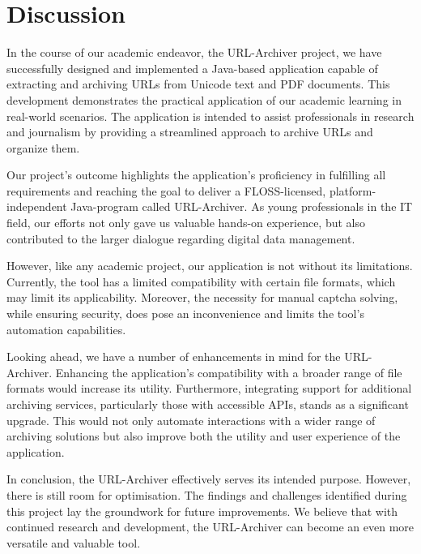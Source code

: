 \section{Discussion}
In the course of our academic endeavor, the URL-Archiver project, we have successfully designed and implemented a Java-based application capable of extracting and archiving URLs from Unicode text and PDF documents.
This development demonstrates the practical application of our academic learning in real-world scenarios.
The application is intended to assist professionals in research and journalism by providing a streamlined approach to archive URLs and organize them.

Our project's outcome highlights the application’s proficiency in fulfilling all requirements and reaching the goal to deliver a FLOSS-licensed, platform-independent Java-program called URL-Archiver.
As young professionals in the IT field, our efforts not only gave us valuable hands-on experience, but also contributed to the larger dialogue regarding digital data management.

However, like any academic project, our application is not without its limitations.
Currently, the tool has a limited compatibility with certain file formats, which may limit its applicability.
Moreover, the necessity for manual captcha solving, while ensuring security, does pose an inconvenience and limits the tool's automation capabilities.

Looking ahead, we have a number of enhancements in mind for the URL-Archiver.
Enhancing the application's compatibility with a broader range of file formats would increase its utility.
Furthermore, integrating support for additional archiving services, particularly those with accessible APIs, stands as a significant upgrade.
This would not only automate interactions with a wider range of archiving solutions but also improve both the utility and user experience of the application.

In conclusion, the URL-Archiver effectively serves its intended purpose. However, there is still room for optimisation.
The findings and challenges identified during this project lay the groundwork for future improvements.
We believe that with continued research and development, the URL-Archiver can become an even more versatile and valuable tool.
